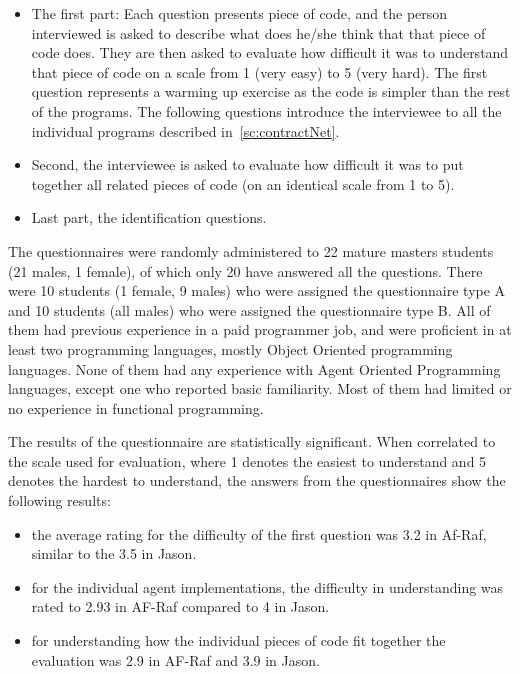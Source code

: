 \documentclass[a4paper,12pt,oneside,fleqn]{book} %
\begin{document}
\begin{itemize}
    \item The first part: Each question presents piece of code, and the
      person interviewed is asked to describe what does he/she think that
      that piece of code does. They are then  asked to evaluate how
      difficult it was to understand that piece of code on a scale from 1
      (very easy) to 5 (very hard). The first question represents a warming
      up exercise as the code is simpler than the rest of the programs. The
      following questions introduce the interviewee to all the individual
      programs described in~\autoref{sc:contractNet}.

    \item Second, the interviewee is asked to evaluate how difficult
      it was to put together all related pieces of code (on an identical
      scale from 1 to 5).

    \item Last part, the identification questions.

\end{itemize}

The questionnaires were randomly administered to 22 mature masters
students (21 males, 1 female), of which only 20 have answered all the
questions. There were 10 students (1 female, 9 males) who were assigned the
questionnaire type A and 10 students (all males) who were assigned
the questionnaire type B. All of them had previous experience in a paid
programmer job, and were proficient in at least two programming languages,
mostly Object Oriented programming languages. None of them had any
experience with Agent Oriented Programming languages, except one who
reported basic familiarity. Most of them had limited or no experience in
functional programming.

The results of the questionnaire are statistically significant. When
correlated to the scale used for evaluation, where 1 denotes the easiest to
understand and 5 denotes the hardest to understand, the answers from the
questionnaires show the following results:

\begin{itemize}
    \item the average rating for the difficulty of the first question was
      3.2 in Af-Raf, similar to the 3.5 in Jason. 
    \item for the individual agent implementations, the difficulty in
      understanding was rated to 2.93 in AF-Raf compared to 4 in Jason.
    \item for understanding how the individual pieces of code fit
      together the evaluation was 2.9 in AF-Raf and 3.9 in Jason.
\end{itemize}
\end{document}
